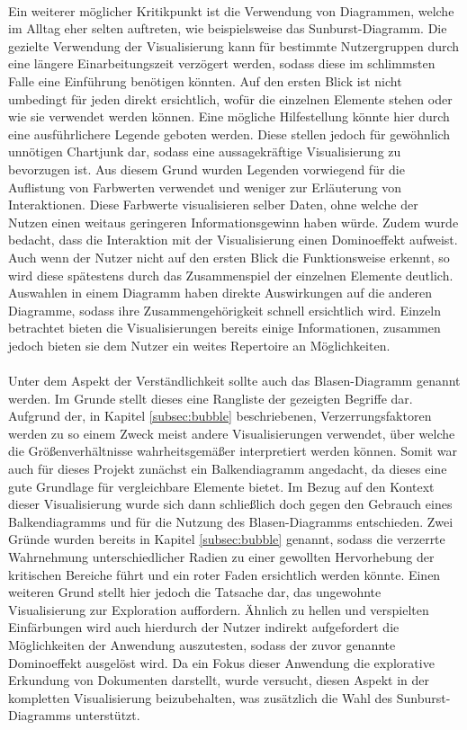 \\
Ein weiterer m\"oglicher Kritikpunkt ist die Verwendung von Diagrammen, welche im Alltag eher selten auftreten, wie beispielsweise das Sunburst-Diagramm. Die gezielte Verwendung der Visualisierung kann f\"ur bestimmte Nutzergruppen durch eine l\"angere Einarbeitungszeit verz\"ogert werden, sodass diese im schlimmsten Falle eine Einf\"uhrung ben\"otigen k\"onnten. Auf den ersten Blick ist nicht umbedingt f\"ur jeden direkt ersichtlich, wof\"ur die einzelnen Elemente stehen oder wie sie verwendet werden k\"onnen. Eine m\"ogliche Hilfestellung k\"onnte hier durch eine ausf\"uhrlichere Legende geboten werden. Diese stellen jedoch f\"ur gew\"ohnlich unn\"otigen Chartjunk dar, sodass eine aussagekr\"aftige Visualisierung zu bevorzugen ist. Aus diesem Grund wurden Legenden vorwiegend f\"ur die Auflistung von Farbwerten verwendet und weniger zur Erl\"auterung von Interaktionen. Diese Farbwerte visualisieren selber Daten, ohne welche der Nutzen einen weitaus geringeren Informationsgewinn haben w\"urde. Zudem wurde bedacht, dass die Interaktion mit der Visualisierung einen Dominoeffekt aufweist. Auch wenn der Nutzer nicht auf den ersten Blick die Funktionsweise erkennt, so wird diese sp\"atestens durch das Zusammenspiel der einzelnen Elemente deutlich. Auswahlen in einem Diagramm haben direkte Auswirkungen auf die anderen Diagramme, sodass ihre Zusammengeh\"origkeit schnell ersichtlich wird. Einzeln betrachtet bieten die Visualisierungen bereits einige Informationen, zusammen jedoch bieten sie dem Nutzer ein weites Repertoire an M\"oglichkeiten.\\
\\
Unter dem Aspekt der Verst\"andlichkeit sollte auch das Blasen-Diagramm genannt werden. Im Grunde stellt dieses eine Rangliste der gezeigten Begriffe dar. Aufgrund der, in Kapitel \ref{subsec:bubble} beschriebenen, Verzerrungsfaktoren werden zu so einem Zweck meist andere Visualisierungen verwendet, \"uber welche die Gr\"o{\ss}enverh\"altnisse wahrheitsgem\"a{\ss}er interpretiert werden k\"onnen. Somit war auch f\"ur dieses Projekt zun\"achst ein Balkendiagramm angedacht, da dieses eine gute Grundlage f\"ur vergleichbare Elemente bietet. Im Bezug auf den Kontext dieser Visualisierung wurde sich dann schlie{\ss}lich doch gegen den Gebrauch eines Balkendiagramms und f\"ur die Nutzung des Blasen-Diagramms entschieden. Zwei Gr\"unde wurden bereits in Kapitel \ref{subsec:bubble} genannt, sodass die verzerrte Wahrnehmung unterschiedlicher Radien zu einer gewollten Hervorhebung der kritischen Bereiche f\"uhrt und ein roter Faden ersichtlich werden k\"onnte. Einen weiteren Grund stellt hier jedoch die Tatsache dar, das ungewohnte Visualisierung zur Exploration auffordern. \"Ahnlich zu hellen und verspielten Einf\"arbungen wird auch hierdurch der Nutzer indirekt aufgefordert die M\"oglichkeiten der Anwendung auszutesten, sodass der zuvor genannte Dominoeffekt ausgel\"ost wird. Da ein Fokus dieser Anwendung die explorative Erkundung von Dokumenten darstellt, wurde versucht, diesen Aspekt in der kompletten Visualisierung beizubehalten, was zus\"atzlich die Wahl des Sunburst-Diagramms unterst\"utzt.\\

